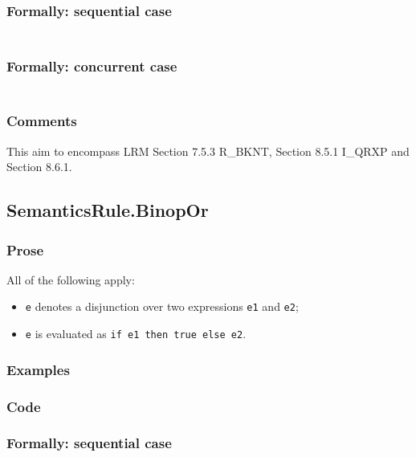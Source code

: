 \documentclass{book}
\begin{document}
  \subsubsection{Formally: sequential case}
  \begin{align}
  \end{align} 

  \subsubsection{Formally: concurrent case}
  \begin{align}
  \end{align} 

  \subsubsection{Comments}
  This aim to encompass LRM Section 7.5.3 R\_BKNT, Section 8.5.1 I\_QRXP and Section
  8.6.1.

\subsection{SemanticsRule.BinopOr \label{sec:SemanticsRule.BinopOr}}
  \subsubsection{Prose}
  All of the following apply:
  \begin{itemize}
  \item \texttt{e} denotes a disjunction over two expressions \texttt{e1} and \texttt{e2};
  \item \texttt{e} is evaluated as \texttt{if e1 then true else e2}.
  \end{itemize}

  \subsubsection{Examples}

  \subsubsection{Code}

  \subsubsection{Formally: sequential case}
  \begin{align}
  \end{align} 
\end{document}
